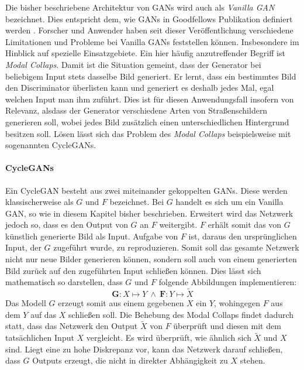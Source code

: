 Die bisher beschriebene Architektur von \acp{GAN} wird auch als \emph{Vanilla \ac{GAN}} bezeichnet. Dies entspricht dem, wie \acp{GAN} in Goodfellows Publikation definiert werden \cite{Goodfellow-GANs}. Forscher und Anwender haben seit dieser Veröffentlichung verschiedene Limitationen und Probleme bei Vanilla \acp{GAN} feststellen können. Insbesondere im Hinblick auf spezielle Einsatzgebiete. Ein hier häufig anzutreffender Begriff ist \emph{Modal Collaps}. Damit ist die Situation gemeint, dass der Generator bei beliebigem Input stets dasselbe Bild generiert. Er lernt, dass ein bestimmtes Bild den Discriminator überlisten kann und generiert es deshalb jedes Mal, egal welchen Input man ihm zuführt. Dies ist für diesen Anwendungsfall insofern von Relevanz, alsdass der Generator verschiedene Arten von Straßenschildern generieren soll, wobei jedes Bild zusätzlich einen unterschiedlichen Hintergrund besitzen soll. Lösen lässt sich das Problem des \emph{Modal Collaps} beispielsweise mit sogenannten \acp{CycleGAN}. \cite{visualApproach}

\paragraph{CycleGANs}
Ein \ac{CycleGAN} besteht aus zwei miteinander gekoppelten \acp{GAN}. Diese werden klassischerweise als $G$ und $F$ bezeichnet. Bei $G$ handelt es sich um ein Vanilla \ac{GAN}, so wie in diesem Kapitel bisher beschrieben. Erweitert wird das Netzwerk jedoch so, dass es den Output von $G$ an $F$ weitergibt. $F$ erhält somit das von $G$ künstlich generierte Bild als Input. Aufgabe von $F$ ist, daraus den ursprünglichen Input, der $G$ zugeführt wurde, zu reproduzieren. Somit soll das gesamte Netzwerk nicht nur neue Bilder generieren können, sondern soll auch von einem generierten Bild zurück auf den zugeführten Input schließen können. Dies lässt sich mathematisch so darstellen, dass $G$ und $F$ folgende Abbildungen implementieren:
\begin{equation}
	\mathbf{G}: X\mapsto Y \: \wedge \: \mathbf{F}: Y\mapsto \tilde{X}
\end{equation}
Das Modell $G$ erzeugt somit aus einem gegebenen $X$ ein $Y$, wohingegen $F$ aus dem $Y$ auf das $X$ schließen soll. Die Behebung des Modal Collaps findet dadurch statt, dass das Netzwerk den Output $\tilde{X}$ von $F$ überprüft und diesen mit dem tatsächlichen Input $X$ vergleicht. Es wird überprüft, wie ähnlich sich $\tilde{X}$ und $X$ sind. Liegt eine zu hohe Diskrepanz vor, kann das Netzwerk darauf schließen, dass $G$ Outputs erzeugt, die nicht in direkter Abhängigkeit zu $X$ stehen.

